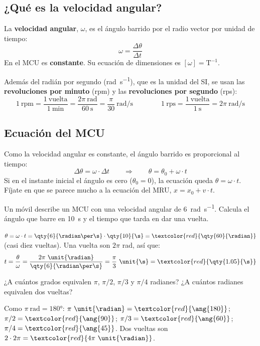 \subsection{¿Qué es la velocidad angular?}

\begin{definition}
    La \textbf{velocidad angular}, \(\omega\), es el ángulo barrido por el radio vector por unidad de tiempo:
    \[ \omega = \frac{\Delta\theta}{\Delta t} \]
    En el MCU es \textbf{constante}. Su ecuación de dimensiones es \([\omega] = \mathrm{T}^{-1}\).
\end{definition}

Además del radián por segundo (\unit{\radian\per\s}), que es la unidad del SI, se usan las \textbf{revoluciones por minuto} (rpm) y las \textbf{revoluciones por segundo} (rps):
\[ 1~\text{rpm} = \frac{1~\text{vuelta}}{1~\text{min}} = \frac{2\pi~\unit{\radian}}{\qty{60}{\s}} = \frac{\pi}{30}~\unit{\radian\per\s} \qquad\qquad 1~\text{rps} = \frac{1~\text{vuelta}}{1~\unit{\s}} = 2\pi~\unit{\radian\per\s} \]

\subsection{Ecuación del MCU}

Como la velocidad angular es constante, el ángulo barrido es proporcional al tiempo:
\[ \Delta\theta = \omega \cdot \Delta t \qquad\Rightarrow\qquad \theta = \theta_0 + \omega \cdot t \]
Si en el instante inicial el ángulo es cero (\(\theta_0 = 0\)), la ecuación queda \(\theta = \omega \cdot t\). Fíjate en que se parece mucho a la ecuación del MRU, \(x = x_0 + v \cdot t\).

\begin{example}
    Un móvil describe un MCU con una velocidad angular de \qty{6}{\radian\per\s}. Calcula el ángulo que barre en \qty{10}{\s} y el tiempo que tarda en dar una vuelta.

    \(\theta = \omega \cdot t = \qty{6}{\radian\per\s} \cdot \qty{10}{\s} = \textcolor{red}{\qty{60}{\radian}}\) (casi diez vueltas). Una vuelta son \(2\pi\) rad, así que:
    \[ t = \frac{\theta}{\omega} = \frac{2\pi~\unit{\radian}}{\qty{6}{\radian\per\s}} = \frac{\pi}{3}~\unit{\s} = \textcolor{red}{\qty{1.05}{\s}} \]
\end{example}

\begin{exercise}
    ¿A cuántos grados equivalen \(\pi\), \(\pi/2\), \(\pi/3\) y \(\pi/4\) radianes? ¿A cuántos radianes equivalen dos vueltas?
    \begin{solu}
        Como \(\pi~\unit{\radian} = \ang{180}\): \(\pi~\unit{\radian} = \textcolor{red}{\ang{180}}\); \(\pi/2 = \textcolor{red}{\ang{90}}\); \(\pi/3 = \textcolor{red}{\ang{60}}\); \(\pi/4 = \textcolor{red}{\ang{45}}\). Dos vueltas son \(2 \cdot 2\pi = \textcolor{red}{4\pi~\unit{\radian}}\).
    \end{solu}
\end{exercise}


